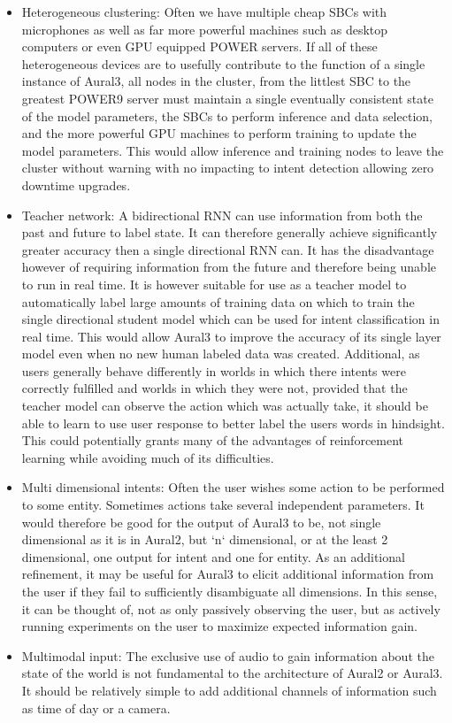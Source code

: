 \documentclass[conference]{IEEEtran}
\begin{document}
\begin{itemize}
\item Heterogeneous clustering: Often we have multiple cheap SBCs with microphones as well as far more powerful machines such as desktop computers or even GPU equipped POWER servers.
If all of these heterogeneous devices are to usefully contribute to the function of a single instance of Aural3, all nodes in the cluster,
from the littlest SBC to the greatest POWER9 server must maintain a single eventually consistent state of the model parameters,
the SBCs to perform inference and data selection, and the more powerful GPU machines to perform training to update the model parameters.
This would allow inference and training nodes to leave the cluster without warning with no impacting to intent detection allowing zero downtime upgrades.

\item Teacher network: A bidirectional RNN can use information from both the past and future to label state.
It can therefore generally achieve significantly greater accuracy then a single directional RNN can. It has the disadvantage however of requiring information from the future and therefore being unable to run in real time.
It is however suitable for use as a teacher model\cite{b9} to automatically label large amounts of training data on which to train the single directional student model which can be used for intent classification in real time.
This would allow Aural3 to improve the accuracy of its single layer model even when no new human labeled data was created. Additional, as users generally behave differently in worlds in which there intents were correctly fulfilled and worlds in which they were not, provided that the teacher model can observe the action which was actually take, it should be able to learn to use user response to better label the users words in hindsight. This could potentially grants many of the advantages of reinforcement learning while avoiding much of its difficulties.

\item Multi dimensional intents: Often the user wishes some action to be performed to some entity.
Sometimes actions take several independent parameters.
It would therefore be good for the output of Aural3 to be, not single dimensional as it is in Aural2, but `n` dimensional, or at the least 2 dimensional, one output for intent and one for entity. As an additional refinement, it may be useful for Aural3 to elicit additional information from the user if they fail to sufficiently disambiguate all dimensions. In this sense, it can be thought of, not as only passively observing the user, but as actively running experiments on the user to maximize expected information gain.

\item Multimodal input: The exclusive use of audio to gain information about the state of the world is not fundamental to the architecture of Aural2 or Aural3.
It should be relatively simple to add additional channels of information such as time of day or a camera.
\end{itemize}
\end{document}
